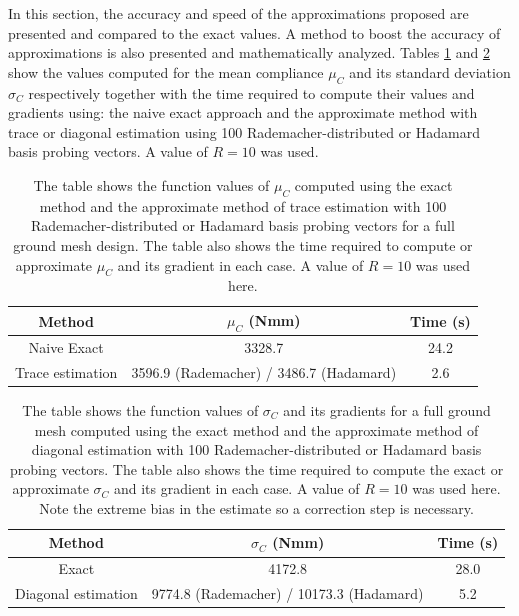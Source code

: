 In this section, the accuracy and speed of the approximations proposed are presented and compared to the exact values. A method to boost the accuracy of approximations is also presented and mathematically analyzed. Tables \ref{tab:time_mean} and \ref{tab:time_std} show the values computed for the mean compliance $\mu_C$ and its standard deviation $\sigma_C$ respectively together with the time required to compute their values and gradients using: the naive exact approach and the approximate method with trace or diagonal estimation using 100 Rademacher-distributed or Hadamard basis probing vectors. A value of $R = 10$ was used.
\begin{table}
 \centering
 \caption{The table shows the function values of $\mu_C$ computed using the exact method and the approximate method of trace estimation with 100 Rademacher-distributed or Hadamard basis probing vectors for a full ground mesh design. The table also shows the time required to compute or approximate $\mu_C$ and its gradient in each case. A value of $R = 10$ was used here.}
 \begin{tabular}{|c|c|c|}
  \hline
  Method & $\mu_C$ (Nmm) & Time (s) \\
  \hline
  \hline
  Naive Exact & 3328.7 & 24.2 \\
  \hline
  Trace estimation & 3596.9 (Rademacher) / 3486.7 (Hadamard) & 2.6 \\
  \hline
 \end{tabular}
 \label{tab:time_mean}
\end{table}

\begin{table}
 \centering
 \caption{The table shows the function values of $\sigma_C$ and its gradients for a full ground mesh computed using the exact method and the approximate method of diagonal estimation with 100 Rademacher-distributed or Hadamard basis probing vectors. The table also shows the time required to compute the exact or approximate $\sigma_C$ and its gradient in each case. A value of $R = 10$ was used here. Note the extreme bias in the estimate so a correction step is necessary.}
 \begin{tabular}{|c|c|c|}
  \hline
  Method & $\sigma_C$ (Nmm) & Time (s) \\
  \hline
  \hline
  Exact & 4172.8 & 28.0 \\
  \hline
  Diagonal estimation & 9774.8 (Rademacher) / 10173.3 (Hadamard) & 5.2 \\
  \hline
 \end{tabular}
 \label{tab:time_std}
\end{table}

